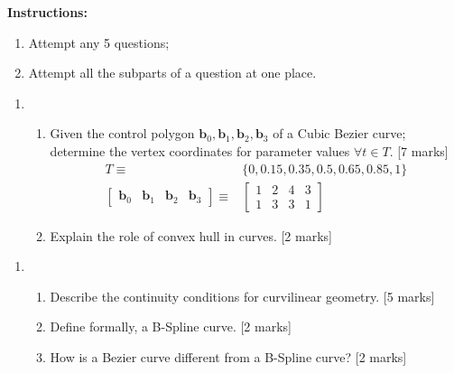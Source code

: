 \documentclass[11pt]{qptiet}
\date{\today}
\title{}
\begin{document}
\maketitle

\textbf{Instructions:}
\begin{enumerate}
\item Attempt any 5 questions;
\item Attempt all the subparts of a question at one place.
\end{enumerate}

\bvrhrule\bvrskipline

\begin{enumerate}
\item \begin{enumerate}
\item Given the control polygon \(\textbf{b}_0,
      \textbf{b}_1, \textbf{b}_2, \textbf{b}_3\) of a
Cubic Bezier curve; determine the vertex
coordinates for parameter values \(\forall t\in
      T\). \hfill [7 marks]
\begin{align*}
  T \equiv
  & \{0, 0.15, 0.35, 0.5, 0.65, 0.85, 1\} \\
  \begin{bmatrix}
    \textbf{b}_0 &\textbf{b}_1& \textbf{b}_2& \textbf{b}_3
  \end{bmatrix} \equiv& \begin{bmatrix}
    1&2&4&3\\ 1&3&3&1
  \end{bmatrix}
\end{align*}

\item Explain the role of convex hull in curves.
\hfill[2 marks]
\end{enumerate}
\end{enumerate}

\bvrhrule

\begin{enumerate}[resume]
\item \begin{enumerate}
\item Describe the continuity conditions for
curvilinear geometry.  \hfill[5 marks]
\item Define formally, a B-Spline curve. \hfill [2
marks]
\item How is a Bezier curve different from a B-Spline
curve? \hfill [2 marks]
\end{enumerate}
\end{enumerate}
\end{document}

